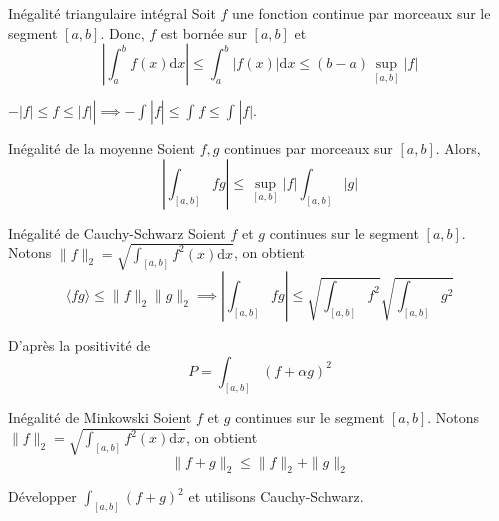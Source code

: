 \begin{Theorem}{Inégalité triangulaire intégral}{}
  Soit $f$ une fonction continue par morceaux sur le segment $[a,b]$. Donc, $f$ est bornée sur $[a,b]$ et 
  \begin{equation}
    \boxed{\left|\int_{a}^{b} f(x) \mathrm{d}x\right| \le \int_{a}^{b} |f(x)| \mathrm{d} x \le (b-a) \sup _{[a,b]}|f|}
  \end{equation}
\end{Theorem}

\begin{myproof}{}{}
$- |f| \le f \le |f|| \implies - \int_{}^{}|f| \le \int_{}^{}f \le \int_{}^{}|f| $.
\end{myproof}

\begin{Theorem}{Inégalité de la moyenne}{}
  Soient $f,g$ continues par morceaux sur $[a,b]$. Alors, 
  \begin{equation}
    \left| \int_{[a,b]}^{} fg\right| \le \sup _{[a,b]} |f| \int_{[a,b]}^{}|g|
  \end{equation}
\end{Theorem}

\begin{Theorem}{Inégalité de Cauchy-Schwarz}{}
  Soient $f$ et $g$ continues sur le segment $[a,b]$. Notons $\|f \|_2 = \sqrt{\int_{[a,b]}^{}f ^{2}(x) \mathrm{d}x}$, on obtient 
  \begin{equation}
    \langle fg \rangle \le\| f \|_2 \| g \|_2 \implies\boxed{\left| \int_{[a,b]}^{}fg \right| \le \sqrt{\int_{[a,b]}^{}f ^{2}} \sqrt{\int_{[a,b]}^{}g ^{2}}}
  \end{equation}
\end{Theorem}

\begin{myproof}{}{}
D'après la positivité de 
\begin{equation}
  P = \int_{[a,b]}^{}(f+\alpha g) ^{2}
\end{equation}
\end{myproof}

\begin{Theorem}{Inégalité de Minkowski}{}
  Soient $f$ et $g$ continues sur le segment $[a,b]$. Notons $\|f \|_2 = \sqrt{\int_{[a,b]}^{}f ^{2}(x) \mathrm{d}x}$, on obtient 
  \begin{equation}
    \| f+g \|_2 \le \| f \|_2 + \| g \|_2
  \end{equation}
\end{Theorem}

\begin{myproof}{}{}
  Développer $\int_{[a,b]}^{}(f+g) ^{2}$ et utilisons Cauchy-Schwarz.
\end{myproof}











